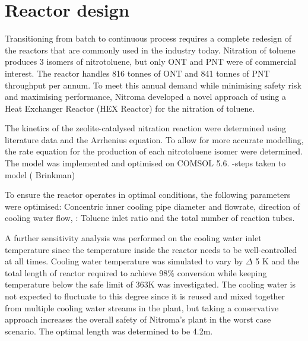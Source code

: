 \section*{Reactor design}
Transitioning from batch to continuous process requires a complete redesign of the reactors that are commonly used in the industry today. Nitration of toluene produces 3 isomers of nitrotoluene, but only ONT and PNT were of commercial interest. The reactor handles 816 tonnes of ONT and 841 tonnes of PNT throughput per annum. To meet this annual demand while minimising safety risk and maximising performance, Nitroma developed a novel approach of using a Heat Exchanger Reactor (HEX Reactor) for the nitration of toluene.

The kinetics of the zeolite-catalysed nitration reaction were determined using literature data and the Arrhenius equation. To allow for more accurate modelling, the rate equation for the production of each nitrotoluene isomer were determined. 
The model was implemented and optimised on COMSOL 5.6. 
-steps taken to model ( Brinkman) 

To ensure the reactor operates in optimal conditions, the following parameters were optimised: Concentric inner cooling pipe diameter and flowrate, direction of cooling water flow,  : Toluene inlet ratio and the total number of reaction tubes.



A further sensitivity analysis was performed on the cooling water inlet temperature since the temperature inside the reactor needs to be well-controlled at all times. Cooling water temperature was simulated to vary by \mypm $\Delta$ 5 K and the total length of reactor required to achieve 98\% conversion while keeping temperature below the safe limit of 363K was investigated. The cooling water is not expected to fluctuate to this degree since it is reused and mixed together from multiple cooling water streams in the plant, but taking a conservative approach increases the overall safety of Nitroma's plant in the worst case scenario. The optimal length was determined to be 4.2m. 


